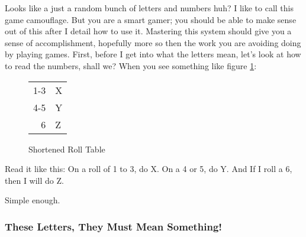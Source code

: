 \documentclass[a6paper,hidelinks]{article}
\begin{document}
Looks like a just a random bunch of letters and numbers huh? I like to call this game camouflage. But you are a smart gamer; you should be able to make sense out of this after I detail how to use it. Mastering this system
should give you a sense of accomplishment, hopefully more so then the work you are avoiding doing by playing games. First, before I get into what the letters mean, let's look at how to read the numbers, shall we?
When you see something like figure \ref{fig:shortened_roll_table}:

\begin{figure}[h]
\caption{Shortened Roll Table}
\label{fig:shortened_roll_table}
\centering
\begin{tabular}{| r | l |}
\hline
1-3 & X \\
4-5 & Y \\
  6 & Z \\
\hline
\end{tabular}
\end{figure}

Read it like this: On a roll of 1 to 3, do X. On a 4 or 5, do Y. And If I roll a 6,
then I will do Z.

Simple enough.


\subsubsection{These Letters, They Must Mean Something!}
\end{document}
